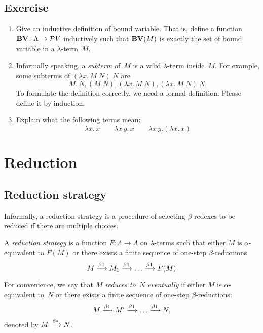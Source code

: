 \subsection*{Exercise}
\begin{enumerate}
  \item Give an inductive definition of bound variable. That is, define a
    function $\mathbf{BV}\colon \Lambda \to \mathcal{P}V$ inductively
    such that $\mathbf{BV}(M)$ is exactly the set of bound variable in a
    $\lambda$-term~$M$.
  \item Informally speaking, a \emph{subterm} of~$M$ is a valid $\lambda$-term
    inside~$M$. For example, some subterms of $(\lambda x.\, M\;N)\;N$ are
    \[
      M, N, (M\;N), (\lambda x.\, M\;N), (\lambda x.\, M\;N)\:N.
    \]
    To formulate the definition correctly, we need a formal definition. Please
    define it by induction.
  \item Explain what the following terms mean:
    \[
      \lambda x.\,x
      \qquad
      \lambda x\,y.\,x
      \qquad
      \lambda x\,y. (\lambda x.\, x)
    \]
\end{enumerate}

\section{Reduction}
\subsection{Reduction strategy}
Informally, a reduction strategy is a procedure of selecting $\beta$-redexes
to be reduced if there are multiple choices. 
\begin{definition}
  A \emph{reduction strategy} is a function $F\colon\Lambda\to\Lambda$ on
  $\lambda$-terms such that either $M$ is $\alpha$-equivalent to $F(M)$ or there
  exists a finite sequence of one-step $\beta$-reductions
      \[
        M \xrightarrow{\beta1} M_1 \xrightarrow{\beta1} \dots \xrightarrow{\beta1} F(M)
      \]
\end{definition}
For convenience, we say that \emph{$M$ reduces to~$N$ eventually} if either $M$ is
$\alpha$-equivalent to~$N$ or there exists a finite sequence of
one-step $\beta$-reductions:
\[
  M \xrightarrow{\beta1} M' \xrightarrow{\beta1} \dots \xrightarrow{\beta1} N,
\]
denoted by $M \xrightarrow{\beta*} N$.

